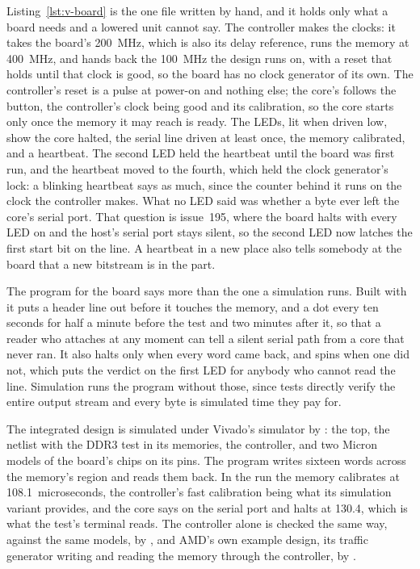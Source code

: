 \documentclass[journal,onecolumn,9pt]{IEEEtran}
\begin{document}
Listing~\ref{lst:v-board} is the one file written by hand, and it
holds only what a board needs and a lowered unit cannot say. The
controller makes the clocks: it takes the board's 200~MHz, which is
also its delay reference, runs the memory at 400~MHz, and hands back
the 100~MHz the design runs on, with a reset that holds until that
clock is good, so the board has no clock generator of its own. The
controller's reset is a pulse at power-on and nothing else; the core's
follows the button, the controller's clock being good and its
calibration, so the core starts only once the memory it may reach is
ready. The LEDs, lit when driven low, show the
core halted, the serial line driven at least once, the memory
calibrated, and a heartbeat. The second LED held the heartbeat until
the board was first run, and the heartbeat moved to the fourth, which
held the clock generator's lock: a blinking heartbeat says as much,
since the counter behind it runs on the clock the controller makes. What no LED said was
whether a byte ever left the core's serial port. That question is
issue~195, where the board halts with every LED on and the host's
serial port stays silent, so the second LED now latches the first start
bit on the line. A heartbeat in a new place also tells somebody at the
board that a new bitstream is in the part.

The program for the board says more than the one a simulation runs.
Built with  it puts a header line out before
it touches the memory, and a dot every ten seconds for half a minute
before the test and two minutes after it, so that a reader who
attaches at any moment can tell a silent serial path from a core that
never ran. It also halts only when every word came back, and spins
when one did not, which puts the verdict on the first LED for anybody
who cannot read the line. Simulation runs the program without those,
since tests directly verify the entire output stream and every byte is
simulated time they pay for.

The integrated design is simulated under Vivado's simulator by
: the top, the netlist with
the DDR3 test in its memories, the controller, and two Micron models
of the board's chips on its pins. The program writes sixteen words
across the memory's region and reads them back. In the run the memory
calibrates at 108.1~microseconds, the controller's fast calibration
being what its simulation variant provides, and the core says
 on the serial port and halts at 130.4, which is what
the test's terminal reads. The controller alone is checked the same
way, against the same models, by , and
AMD's own example design, its traffic generator writing and reading
the memory through the controller, by .
\end{document}
